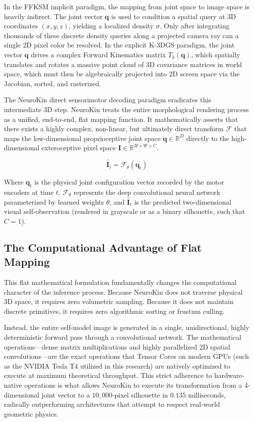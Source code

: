 \documentclass[12pt,a4paper,oneside]{report}
\begin{document}
In the FFKSM implicit paradigm, the mapping from joint space to image space is heavily indirect. The joint vector $\mathbf{q}$ is used to condition a spatial query at 3D coordinates $(x, y, z)$, yielding a localized density $\sigma$. Only after integrating thousands of these discrete density queries along a projected camera ray can a single 2D pixel color be resolved. In the explicit K-3DGS paradigm, the joint vector $\mathbf{q}$ drives a complex Forward Kinematics matrix $T_k(\mathbf{q})$, which spatially translates and rotates a massive point cloud of 3D covariance matrices in world space, which must then be algebraically projected into 2D screen space via the Jacobian, sorted, and rasterized.

The NeuroKin direct sensorimotor decoding paradigm eradicates this intermediate 3D step. NeuroKin treats the entire morphological rendering process as a unified, end-to-end, flat mapping function. It mathematically asserts that there exists a highly complex, non-linear, but ultimately direct transform $\mathcal{F}$ that maps the low-dimensional proprioceptive joint space $\mathbf{q} \in \mathbb{R}^D$ directly to the high-dimensional exteroceptive pixel space $\mathbf{I} \in \mathbb{R}^{H \times W \times C}$. 

\begin{equation}
\hat{\mathbf{I}}_t = \mathcal{F}_\theta(\mathbf{q}_t)
\end{equation}

Where $\mathbf{q}_t$ is the physical joint configuration vector recorded by the motor encoders at time $t$, $\mathcal{F}_\theta$ represents the deep convolutional neural network parameterized by learned weights $\theta$, and $\hat{\mathbf{I}}_t$ is the predicted two-dimensional visual self-observation (rendered in grayscale or as a binary silhouette, such that $C=1$).

\subsection{The Computational Advantage of Flat Mapping}

This flat mathematical formulation fundamentally changes the computational character of the inference process. Because NeuroKin does not traverse physical 3D space, it requires zero volumetric sampling. Because it does not maintain discrete primitives, it requires zero algorithmic sorting or frustum culling. 

Instead, the entire self-model image is generated in a single, unidirectional, highly deterministic forward pass through a convolutional network. The mathematical operations—dense matrix multiplications and highly parallelized 2D spatial convolutions—are the exact operations that Tensor Cores on modern GPUs (such as the NVIDIA Tesla T4 utilized in this research) are natively optimized to execute at maximum theoretical throughput. This strict adherence to hardware-native operations is what allows NeuroKin to execute its transformation from a 4-dimensional joint vector to a $10,000$-pixel silhouette in $0.135$ milliseconds, radically outperforming architectures that attempt to respect real-world geometric physics.
\end{document}
